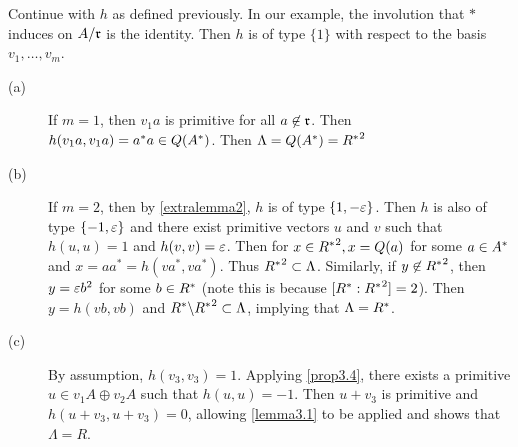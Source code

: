 \begin{example}
Continue with $h$ as defined previously.
In our example, the involution that $*$ induces on $A/\mathfrak{r}$ is the identity.
Then $h$ is of type $\{1\}$ with respect to the basis $v_1, \dotsc, v_m$.
\begin{description}
\item[(a)] If $m = 1$, then $v_1 a$ is primitive for all $a \not\in \mathfrak{r}$.
Then $h(v_1 a, v_1 a) = a^* a \in Q(A^*)$.
Then $\Lambda = Q(A^*) = {R^*} ^2$
\item[(b)] If $m = 2$, then by \cref{extralemma2}, $h$ is of type $\{1, -\varepsilon\}$.
Then $h$ is also of type $\{-1, \varepsilon \}$ and there exist primitive vectors $u$ and $v$ such that $h(u,u) = 1$ and $h(v, v) = \varepsilon$.
Then for $x \in {R^*}^2, x = Q(a)$ for some $a \in A^*$ and $x = aa^* = h(va^*, va^*)$.
Thus ${R^*}^2 \subset \Lambda$.
Similarly, if $y \not\in {R^*}^2$, then $y = \varepsilon b^2$ for some $b \in R^*$ (note this is because $[R^*: {R^*}^2] = 2$).
Then $y = h(vb, vb)$ and $R^* \backslash {R^*}^2 \subset \Lambda$, implying that $\Lambda = R^*$.
\item[(c)] By assumption, $h(v_3, v_3) = 1$. Applying \cref{prop3.4}, there exists a primitive $u \in v_1 A \oplus v_2 A$ such that $h(u,u) = -1$.
Then $u + v_3$ is primitive and $h(u + v_3, u + v_3) = 0$, allowing \cref{lemma3.1} to be applied and shows that $\Lambda = R$.
\end{description}
\end{example}

